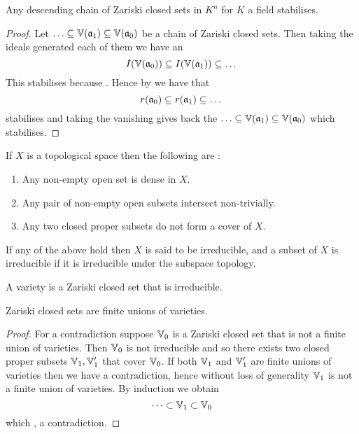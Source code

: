 \begin{prop}
    Any descending chain of Zariski closed sets in $K^n$ for $K$ a field 
    stabilises.
\end{prop}
\begin{proof}
    Let $\dots \subs \V(\f{a}_1) \subs \V(\f{a}_0)$ 
    be a chain of Zariski closed sets.
    Then taking the ideals generated each of them we have an 
    \[I(\mathbb{V}(\mathfrak{a}_0)) \subseteq I(\mathbb{V}(\mathfrak{a}_1)) \subseteq \dots\]
    This stabilises because 
    .
    Hence by 
    we have that 
    \[r(\mathfrak{a}_0) \subseteq r(\mathfrak{a}_1) \subseteq \dots\]
    stabilises and
    taking the vanishing gives back
    the  
    $\dots \subs \V(\f{a}_1) \subs \V(\f{a}_0)$ which stabilises.
\end{proof}

\begin{dfn}
    If $X$ is a topological space
    then the following are :
    \begin{enumerate}
        \item Any non-empty open set is dense in $X$.
        \item Any pair of non-empty open subsets intersect non-trivially.
        \item Any two closed proper subsets do not form a cover of $X$.
    \end{enumerate}
    If any of the above hold then $X$ is said to be irreducible,
    and a subset of $X$ is irreducible if it is irreducible under the 
    subspace topology.

    A variety is a Zariski closed set that is irreducible.
\end{dfn}

\begin{cor}
    Zariski closed sets are finite unions of varieties.
\end{cor}
\begin{proof}
    For a contradiction suppose $\mathbb{V}_0$ 
    is a Zariski closed set that is not a finite union of varieties.
    Then $\mathbb{V}_0$ is not irreducible and so 
    there exists two closed proper subsets $\mathbb{V}_1, \mathbb{V}_1'$ that cover $\mathbb{V}_0$.
    If both $\mathbb{V}_1$ and $\mathbb{V}_1'$ are finite unions of varieties then we have a
    contradiction, 
    hence without loss of generality $\mathbb{V}_1$ is not a finite union of varieties.
    By induction we obtain 
    \[\dots \subset \mathbb{V}_1 \subset \mathbb{V}_0\]
    which , a contradiction.
\end{proof}

